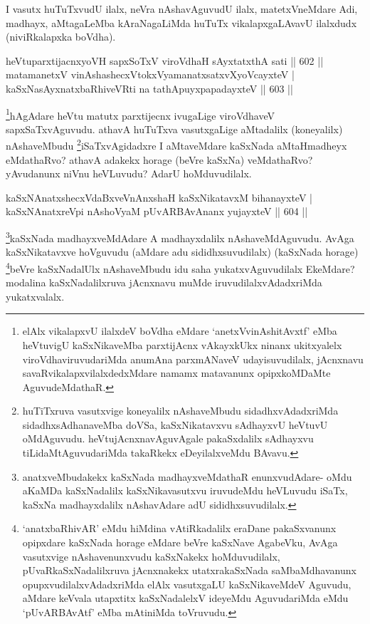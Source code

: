 \begin{artha}
I vasutx huTuTxvudU ilalx, neVra nAshavAguvudU ilalx, matetxVneMdare Adi, madhayx, aMtagaLeMba kAraNagaLiMda huTuTx vikalapxgaLAvavU ilalxdudx (niviRkalapxka boVdha).
\end{artha}


\begin{shl}
heVtuparxtijacnxyoVH sapxSoTxV viroVdhaH sAyxtatxthA sati \hfill||  602 ||  \\
matamanetxV vinAshashecxVtokxV\s yamanatxsatxvXyoVcayxteV | \\
kaSxNasAyxnatxbaRhiveVRti na tathA\s puyxpapadayxteV \hfill||  603 ||  
\end{shl}

\begin{artha}
\footnote{elAlx vikalapxvU ilalxdeV boVdha eMdare `anetxVvinAshitAvxtf' eMba heVtuvigU kaSxNikaveMba parxtijAcnx vAkayxkUkx ninanx ukitxyalelx viroVdhaviruvudariMda anumAna parxmANaveV udayisuvudilalx, jAcnxnavu savaRvikalapxvilalxdedxMdare namamx matavanunx opipxkoMDaMte AguvudeMdathaR.}hAgAdare heVtu matutx parxtijecnx ivugaLige viroVdhaveV sapxSaTxvAguvudu. athavA huTuTxva vasutxgaLige aMtadalilx (koneyalilx) nAshaveMbudu \footnote{huTiTxruva vasutxvige koneyalilx nAshaveMbudu sidadhxvAdadxriMda sidadhxsAdhanaveMba doVSa, kaSxNikatavxvu sAdhayxvU heVtuvU oMdAguvudu. heVtujAcnxnavAguvAgale pakaSxdalilx sAdhayxvu tiLidaMtAguvudariMda takaRkekx eDeyilalxveMdu BAvavu.}iSaTxvAgidadxre I aMtaveMdare kaSxNada aMtaHmadheyx eMdathaRvo? athavA adakekx horage (beVre kaSxNa) veMdathaRvo? yAvudanunx niVnu heVLuvudu? AdarU hoMduvudilalx.
\end{artha}


\begin{shl}
kaSxNAnatxshecxVdaBxveVnAnxshaH kaSxNikatavxM bihanayxteV | \\
kaSxNAnatxreV\s pi nAshoV\s yaM pUvARBAvAnanx yujayxteV \hfill||  604 ||  
\end{shl}

\begin{artha}
\footnote{anatxveMbudakekx kaSxNada madhayxveMdathaR enunxvudAdare- oMdu aKaMDa kaSxNadalilx kaSxNikavasutxvu iruvudeMdu heVLuvudu iSaTx, kaSxNa madhayxdalilx nAshavAdare adU sididhxsuvudilalx.}kaSxNada madhayxveMdAdare A madhayxdalilx nAshaveMdAguvudu. AvAga kaSxNikatavxve hoVguvudu (aMdare adu sididhxsuvudilalx) (kaSxNada horage) \footnote{`anatxbaRhivAR' eMdu hiMdina vAtiRkadalilx eraDane pakaSxvanunx opipxdare kaSxNada horage eMdare beVre kaSxNave AgabeVku, AvAga vasutxvige nAshavenunxvudu kaSxNakekx hoMduvudilalx, pUvaRkaSxNadalilxruva jAcnxnakekx utatxrakaSxNada saMbaMdhavanunx opupxvudilalxvAdadxriMda elAlx vasutxgaLU kaSxNikaveMdeV Aguvudu, aMdare keVvala utapxtitx kaSxNadalelxV ideyeMdu AguvudariMda eMdu `pUvARBAvAtf' eMba mAtiniMda toVruvudu.}beVre kaSxNadalUlx nAshaveMbudu idu saha yukatxvAguvudilalx EkeMdare? modalina kaSxNadalilxruva jAcnxnavu muMde iruvudilalxvAdadxriMda yukatxvalalx.
\end{artha}

